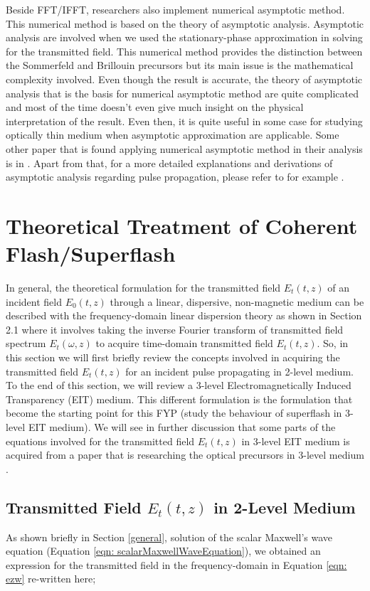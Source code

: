Beside FFT/IFFT, researchers also implement numerical asymptotic method. This numerical method is based on the theory of asymptotic analysis. Asymptotic analysis are involved when we used the stationary-phase approximation in solving for the transmitted field. This numerical method provides the distinction between the Sommerfeld and Brillouin precursors but its main issue is the mathematical complexity involved. Even though the result is accurate, the theory of asymptotic analysis that is the basis for numerical asymptotic method are quite complicated and most of the time doesn't even give much insight on the physical interpretation of the result. Even then, it is quite useful in some case for studying optically thin medium when asymptotic approximation are applicable. Some other paper that is found applying numerical asymptotic method in their analysis is in \cite{Jeong2009}. Apart from that, for a more detailed explanations and derivations of asymptotic analysis regarding pulse propagation, please refer to for example \cite{Oughstun2019}.


\section{Theoretical Treatment of Coherent Flash/Superflash}
In general, the theoretical formulation for the transmitted field $E_{t}(t, z)$ of an incident field $E_{0}(t, z)$ through a linear, dispersive, non-magnetic medium can be described with the frequency-domain linear dispersion theory as shown in Section 2.1 where it involves taking the inverse Fourier transform of transmitted field spectrum $E_{t}(\omega, z)$ to acquire time-domain transmitted field $E_{t}(t, z)$. So, in this section we will first briefly review the concepts involved in acquiring the transmitted field $E_{t}(t, z)$ for an incident pulse propagating in 2-level medium. To the end of this section, we will review a 3-level Electromagnetically Induced Transparency (EIT) medium. This different formulation is the formulation that become the starting point for this FYP (study the behaviour of superflash in 3-level EIT medium). We will see in further discussion that some parts of the equations involved for the transmitted field $E_{t}(t, z)$ in 3-level EIT medium is acquired from a paper that is researching the optical precursors in 3-level medium \cite{jeong2010slow}.

\subsection{Transmitted Field $E_{t}(t, z)$ in 2-Level Medium}
As shown briefly in Section \ref{general}, solution of the scalar Maxwell's wave equation (Equation \ref{eqn: scalarMaxwellWaveEquation}), we obtained an expression for the transmitted field in the frequency-domain in Equation \ref{eqn: ezw} re-written here;

